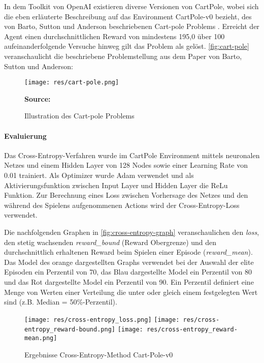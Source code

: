 \documentclass[11pt]{scrartcl}
\newcommand{\source}[1]{\vspace{-5pt} \caption*{\hfill \textbf{Source:} {#1}} }
\begin{document}
In dem Toolkit von OpenAI existieren diverse Versionen von CartPole, wobei sich die eben
erläuterte Beschreibung auf das Environment CartPole-v0 bezieht, des von Barto, Sutton und
Anderson beschriebenen Cart-pole Problems \cite[~S.838 f.]{BSA1983}. Erreicht der Agent einen
durchschnittlichen Reward von mindestens 195,0 über 100 aufeinanderfolgende Versuche hinweg gilt das
Problem als gelöst. \autoref{fig:cart-pole} veranschaulicht die beschriebene Problemstellung aus dem 
Paper\cite{BSA1983} von Barto, Sutton und Anderson:

\begin{figure}[htp]
\centering
\texttt{[image: res/cart-pole.png]}
\caption{Illustration des Cart-pole Problems}
\source{\cite[~S.838]{BSA1983}}
\label{fig:cart-pole}
\end{figure}

\paragraph*{Evaluierung}
\noindent
\newline
Das Cross-Entropy-Verfahren wurde im CartPole Environment mittels neuronalen Netzes und
einem Hidden Layer von 128 Nodes sowie einer Learning Rate von 0.01 trainiert. Als
Optimizer wurde Adam verwendet und als Aktivierungsfunktion zwischen Input Layer und
Hidden Layer die ReLu Funktion. Zur Berechnung eines Loss zwischen Vorhersage des Netzes
und den während des Spielens aufgenommenen Actions wird der Cross-Entropy-Loss verwendet.

Die nachfolgenden Graphen in \autoref{fig:cross-entropy-graph} veranschaulichen den
\textit{loss}, den stetig wachsenden \textit{reward\_bound} (Reward Obergrenze) und den
durchschnittlich erhaltenen Reward beim Spielen einer Episode (\textit{reward\_mean}).
Das Model des orange dargestellten Graphs verwendet bei der Auswahl der elite Episoden
ein Perzentil von 70, das Blau dargestellte Model ein Perzentil von 80 und das Rot
dargestellte Model ein Perzentil von 90. Ein Perzentil definiert eine Menge von Werten
einer Verteilung die unter oder gleich einem festgelegten Wert sind (z.B. Median =
50\%-Perzentil).

\begin{figure}[htp]
\centering
\texttt{[image: res/cross-entropy\_loss.png]}
\texttt{[image: res/cross-entropy\_reward-bound.png]}
\texttt{[image: res/cross-entropy\_reward-mean.png]}
\caption{Ergebnisse Cross-Entropy-Method Cart-Pole-v0}
\label{fig:cross-entropy-graph}
\end{figure}
\end{document}
